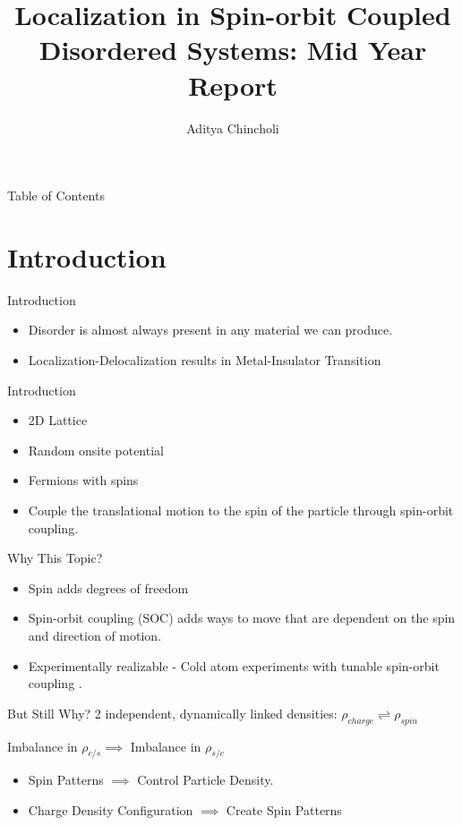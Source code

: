 \documentclass[]{beamer}
\title{Localization in Spin-orbit Coupled Disordered Systems: Mid Year Report}
\author{Aditya Chincholi}
\institute{Indian Institute of Science Education and Research, Pune}
\begin{document}
\frame{\titlepage}

\begin{frame}{Table of Contents}
    \tableofcontents
\end{frame}

\section{Introduction}
\begin{frame}{Introduction}
    \begin{itemize}
        \item Disorder is almost always present in any
        material we can produce.
        \item Localization-Delocalization results in
        Metal-Insulator Transition
    \end{itemize}
\end{frame}

\begin{frame}{Introduction}
\begin{itemize}
    \item 2D Lattice
    \item Random onsite potential
    \item Fermions with spins
    \item Couple the translational motion to the spin
        of the particle through spin-orbit coupling.
\end{itemize}
\end{frame}

\begin{frame}{Why This Topic?}
    \begin{itemize}
        \item Spin adds degrees of freedom
        \item Spin-orbit coupling (SOC) adds ways to move
        that are dependent on the spin and direction of
        motion.
        \item Experimentally realizable - Cold atom
        experiments with tunable spin-orbit coupling
        \cite{orsoAndersonTransitionCold2017,
        huangExperimentalRealizationTwodimensional2016}.
    \end{itemize}
\end{frame}

\begin{frame}{But Still Why?}
    2 independent, dynamically linked densities:
    $\rho_{charge} \rightleftharpoons \rho_{spin}$
    
    Imbalance in $\rho_{c/s} \implies$ Imbalance in $\rho_{s/c}$
    \begin{itemize}
        \item Spin Patterns $\implies$ Control Particle Density.
        \item Charge Density Configuration $\implies$ Create Spin Patterns
    \end{itemize}
\end{frame}
\end{document}

